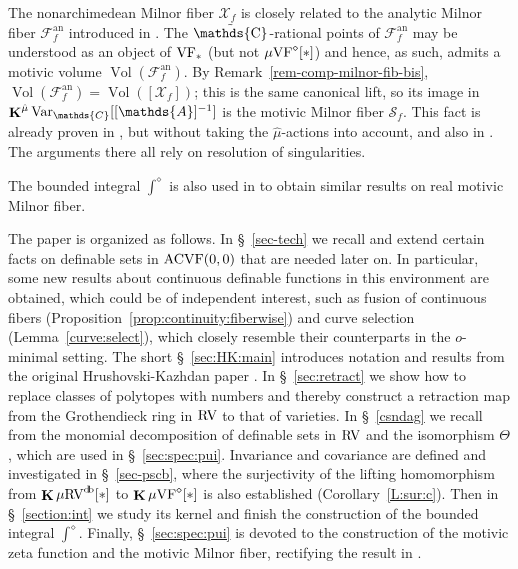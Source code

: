 \documentclass[12pt]{amsart}
\theoremstyle{plain}
\theoremstyle{definition}
\theoremstyle{remark}
\numberwithin{equation}{section}
\theoremstyle{plain}
\newcommand{\VF}{\textup{VF}}
\newcommand{\ACVF}{\textup{ACVF}}
\newcommand{\RV}{\textup{RV}}
\newcommand{\A}{\mathds{A}}
\newcommand{\C}{\mathds{C}}
\newcommand{\omin}{$o$\nobreakdash}
\newcommand{\0}{\emptyset}
\newcommand{\mdl}[1]{\mathcal{#1}}  %
\newcommand{\mgVF}{{\mu} {\VF}}
\newcommand{\mgRV}{{\mu}{\RV}}
\DeclareMathOperator{\ggk}{\mathbf{K}}
\DeclareMathOperator{\db}{d \! b}
\newcommand{\var}{\textup{Var}}
\DeclareMathOperator{\puC}{\tilde \C}
\DeclareMathOperator{\Vol}{Vol}
\newcommand{\gmv}{\ggk^{\hat \mu}\var_{\C}}
\begin{document}
The nonarchimedean Milnor fiber $\mdl X_f$ is closely related to the analytic Milnor fiber $\mathcal{F}^{\mathrm{an}}_{f}$ introduced in \cite{nicaise:sebag:motivic:serre}. The $\puC$-rational points of $\mathcal{F}^{\mathrm{an}}_{f}$ may be understood as an object of  $\VF_*$ (but not $\mgVF^\diamond[*]$) and hence, as such, admits a motivic volume $\Vol(\mathcal{F}^{\mathrm{an}}_{f})$. By Remark~\ref{rem-comp-milnor-fib-bis}, $\Vol(\mathcal{F}^{\mathrm{an}}_{f}) = \Vol([\mdl X_f])$; this is the same canonical lift, so its image in $\gmv[[\A]^{-1}]$ is the motivic Milnor fiber $\mathscr S_{f}$. This fact is already proven  in \cite{nicaise_ps_tropical}, but without taking the $\hat \mu$-actions into account, and also in \cite{Nic:Pay:trop:fub, forey_virtual_2017}. The arguments there all rely on resolution of singularities.

The bounded integral $\int^\diamond$ is also used in \cite{FY:Mot-Int-Mil-Fib} to obtain similar results on real motivic Milnor fiber.


The paper is organized as follows. In \S~\ref{sec-tech} we recall and extend certain facts on definable sets in $\ACVF(0,0)$ that are needed later on. In particular,  some new results about continuous definable functions in this environment are obtained, which could be of independent interest, such as fusion of continuous fibers (Proposition~\ref{prop:continuity:fiberwise}) and curve selection (Lemma~\ref{curve:select}), which closely resemble their counterparts in the \omin-minimal setting. The short \S~\ref{sec:HK:main} introduces notation and results from the original Hrushovski-Kazhdan paper \cite{hrushovski:kazhdan:integration:vf}. In \S~\ref{sec:retract} we show how to replace classes of polytopes with numbers  and thereby construct a retraction map from the Grothendieck ring in $\RV$ to that of varieties. In \S~\ref{csndag} we recall from \cite{FY:Fubini} the monomial decomposition of definable sets in $\RV$ and the isomorphism $\Theta$, which are used in \S~\ref{sec:spec:pui}. Invariance and covariance are defined and investigated  in \S~\ref{sec-pscb}, where the surjectivity of the lifting homomorphism from $\ggk \mgRV^{\db}[*]$ to $\ggk \mgVF^\diamond[*]$ is also established (Corollary~\ref{L:sur:c}). Then in \S~\ref{section:int} we study its kernel and finish the construction of the bounded integral $\int^\diamond$. Finally, \S~\ref{sec:spec:pui} is devoted to the construction of the motivic zeta function and the motivic Milnor fiber, rectifying the result in \cite{hru:loe:lef}.
\end{document}
